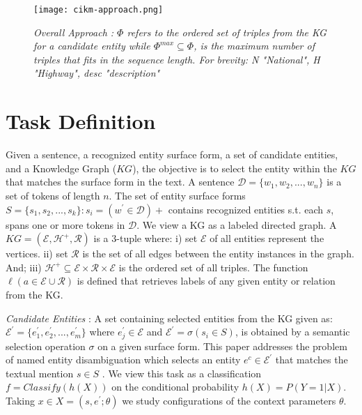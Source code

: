 \documentclass[sigconf, superscriptaddress]{acmart}
\begin{document}
\begin{figure*}[h!]
\centering
\texttt{[image: cikm-approach.png]}
\vspace{-2mm}
\caption{\textit{Overall Approach : $\Phi$ refers to the ordered set of triples from the KG for a candidate entity while $\Phi^{max} \subseteq \Phi$, is the maximum number of triples that fits in the sequence length. For brevity: N \textrightarrow{} "National", H \textrightarrow{} "Highway", desc \textrightarrow {} "description"}}
\label{fig:approach}
\vspace{-2mm}
\end{figure*}
 
\vspace{-2mm}
\section{Task Definition}\label{sect:problem}
Given a sentence, a recognized entity surface form, a set of candidate entities, and a Knowledge Graph ($ KG $), the objective is to select the entity within the $ KG $ that matches the surface form in the text. A sentence $\mathcal{D} = \{ w_1,w_2,...,w_n\}$ is a set of tokens of length $n$. The set of entity surface forms $S = \{s_1,s_2,...,s_k\} : s_i = (w^\prime\in\mathcal{D})+ $ contains recognized entities s.t. each $s$, spans one or more tokens in $\mathcal{D}$. We view a KG as a labeled directed graph. A $KG = (\mathcal{E},\mathcal{H}^+,\mathcal{R})$ is a 3-tuple where: i) set $\mathcal{E}$ of all entities represent the vertices. ii) set $ \mathcal{R} $ is the set of all edges between the entity instances in the graph. And; iii) $\mathcal{H}^+ \subseteq \mathcal{E} \times \mathcal{R} \times \mathcal{E} $ is the ordered set of all triples.
\noindent
\noindent
The function $ \ell (a\in{\mathcal{E}\cup \mathcal{R}})$ is defined that retrieves labels of any given entity or relation from the KG. 



\textit{Candidate Entities} : A set containing selected entities from the KG given as:   $\mathcal{E}^\prime=\{e^\prime_1,e^\prime_2,...,e^\prime_m\}$ where $e^\prime_j \in \mathcal{E}$ and  $\mathcal{E}^\prime = \sigma (s_i \in S) $, is obtained by a semantic selection operation $\sigma$ on a given surface form. This paper addresses the problem of named entity disambiguation which selects an entity $e^c \in \mathcal{E}^\prime$ that matches the textual mention $ s \in S $ . We view this task as a classification $f= Classify(h(X)) $ on the conditional probability $h(X) = P(Y=1|X)$. Taking $x\in X= (s,e^\prime; \theta)$ we study configurations of the context parameters $\theta$. 
\end{document}
